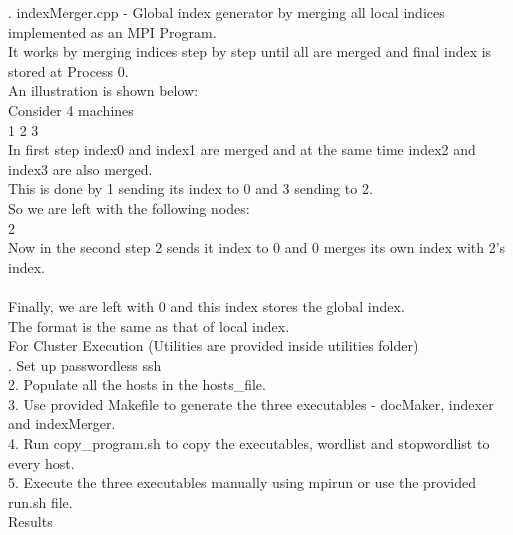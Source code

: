\documentclass[11pt]{article}
\begin{document}
. indexMerger.cpp - Global index generator by merging all local indices implemented as an MPI Program.\\

\noindent It works by merging indices step by step until all are merged and final index is stored at Process 0.\\

\noindent An illustration is shown below:\\

\noindent Consider 4 machines\\

 1 2 3\\

\noindent In first step index0 and index1 are merged and at the same time index2 and index3 are also merged.\\
This is done by 1 sending its index to 0 and 3 sending to 2.\\
So we are left with the following nodes:\\

   2\\

\noindent Now in the second step 2 sends it index to 0 and 0 merges its own index with 2's index.\\

\\

\noindent Finally, we are left with 0 and this index stores the global index.\\

\noindent The format is the same as that of local index.\\


\noindent For Cluster Execution (Utilities are provided inside utilities folder)\\

. Set up passwordless ssh\\
2. Populate all the hosts in the hosts\_file.\\
3. Use provided Makefile to generate the three executables - docMaker, indexer and indexMerger.\\
4. Run copy\_program.sh to copy the executables, wordlist and stopwordlist to every host.\\
5. Execute the three executables manually using mpirun or use the provided run.sh file.\\

\noindent Results\\
\end{document}
